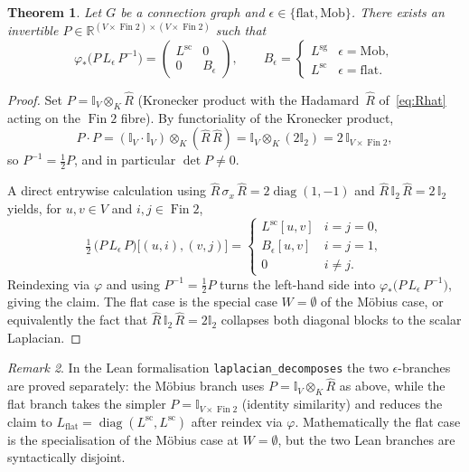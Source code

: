 \documentclass[11pt,a4paper]{amsart}
\theoremstyle{plain}
\newtheorem{theorem}{Theorem}[section]
\theoremstyle{definition}
\theoremstyle{remark}
\newtheorem{remark}[theorem]{Remark}
\DeclareMathOperator{\diag}{diag}
\newcommand{\RR}{\mathbb{R}}
\newcommand{\II}{\mathbb{I}}
\newcommand{\kronprod}{\otimes_{\!K}}
\newcommand{\Lscalar}{L^{\operatorname{sc}}}
\newcommand{\Lsigned}{L^{\operatorname{sg}}}
\begin{document}
\begin{theorem}\label{thm:decomp}
Let $G$ be a connection graph and $\epsilon \in\{\text{flat},\text{Mob}\}$.
There exists an invertible $P\in\RR^{(V\times\operatorname{Fin}2)
  \times (V\times\operatorname{Fin}2)}$ such that
\[
  \varphi_* \bigl( P\, L_\epsilon\, P^{-1} \bigr)
    = \begin{pmatrix}\Lscalar & 0 \\ 0 & B_\epsilon \end{pmatrix},
    \qquad
  B_\epsilon = \begin{cases}
    \Lsigned & \epsilon=\text{Mob},\\
    \Lscalar & \epsilon=\text{flat.}
  \end{cases}
\]
\end{theorem}

\begin{proof}
Set $P = \II_V \kronprod \widehat R$ (Kronecker product with the
Hadamard~$\widehat R$ of~\eqref{eq:Rhat} acting on the
$\operatorname{Fin}2$ fibre). By functoriality of the Kronecker
product,
\[
  P\cdot P
  = (\II_V\cdot \II_V) \kronprod (\widehat R\,\widehat R)
  = \II_V \kronprod (2\II_2)
  = 2\,\II_{V\times \operatorname{Fin}2},
\]
so $P^{-1} = \tfrac{1}{2}P$, and in particular $\det P\ne 0$.

A direct entrywise calculation using
$\widehat R\,\sigma_x\,\widehat R = 2\diag(1,-1)$
and $\widehat R\,\II_2\,\widehat R = 2\,\II_2$ yields, for
$u,v\in V$ and $i,j\in\operatorname{Fin}2$,
\[
  \tfrac{1}{2}\,\bigl(P\, L_\epsilon\, P\bigr)\bigl[(u,i),(v,j)\bigr]
    = \begin{cases}
      \Lscalar[u,v] & i=j=0,\\
      B_\epsilon[u,v] & i=j=1,\\
      0 & i\ne j.
    \end{cases}
\]
Reindexing via $\varphi$ and using
$P^{-1}=\tfrac{1}{2}P$ turns the left-hand side into
$\varphi_*\bigl(P\,L_\epsilon\,P^{-1}\bigr)$, giving the claim.
The flat case is the special case $W=\emptyset$ of the Möbius
case, or equivalently the fact that $\widehat R\,\II_2\,\widehat R=
2\II_2$ collapses both diagonal blocks to the scalar Laplacian.
\end{proof}

\begin{remark}
In the Lean formalisation \texttt{laplacian\_decomposes} the two
$\epsilon$-branches are proved separately: the Möbius branch uses
$P=\II_V\kronprod \widehat R$ as above, while the flat branch takes
the simpler $P=\II_{V\times\operatorname{Fin}2}$ (identity
similarity) and reduces the claim to
$L_{\mathrm{flat}}=\diag(\Lscalar,\Lscalar)$ after reindex via
$\varphi$. Mathematically the flat case is the specialisation of the
Möbius case at $W=\emptyset$, but the two Lean branches are
syntactically disjoint.
\end{remark}
\end{document}
